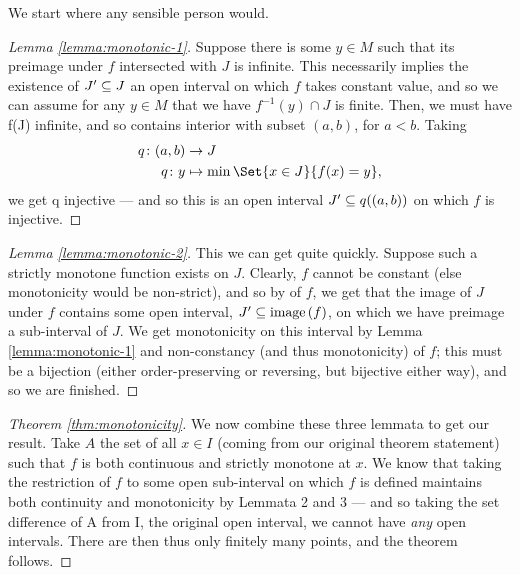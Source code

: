 We start where any sensible person would.

\begin{proof}[Lemma \ref{lemma:monotonic-1}]
  Suppose there is some $y \in M$ such that its preimage under $f$ intersected with $J$ is infinite. This necessarily implies the existence of $ J^{\prime} \subseteq J$ an open interval on which $f$ takes constant value, and so we can assume for any $y \in M$ that we have $f^{-1}(y) \cap J$ is finite. Then, we must have f(J) infinite, and so contains interior with subset $ (a, b) $, for $a < b$. Taking
  \begin{align*}
    q \colon (a, b) &\to J \\
    q \colon y &\mapsto \min{\Set{x \in J}{f(x) = y}},
  \end{align*}
  we get q injective — and so this is an open interval $ J^{\prime} \subseteq q((a, b))$ on which $f$ is injective.
\end{proof}


\begin{proof}[Lemma \ref{lemma:monotonic-2}]
  This we can get quite quickly. Suppose such a strictly monotone function exists on $J$. Clearly, $f$ cannot be constant (else monotonicity would be non-strict), and so by \omy of $f$, we get that the image of $J$ under $f$ contains some open interval, $ J^{\prime} \subseteq \operatorname{image}\left(f\right)$, on which we have preimage a sub-interval of $J$. We get monotonicity on this interval by Lemma \ref{lemma:monotonic-1} and non-constancy (and thus monotonicity) of $f$; this must be a bijection (either order-preserving or reversing, but bijective either way), and so we are finished.
\end{proof}



\begin{proof}[Theorem \ref{thm:monotonicity}]
  We now combine these three lemmata to get our result. Take $A$ the set of all $x \in I$ (coming from our original theorem statement) such that $f$ is both continuous and strictly monotone at $x$. We know that taking the restriction of $f$ to some open sub-interval on which $f$ is defined maintains both continuity and monotonicity by Lemmata 2 and 3 — and so taking the set difference of A from I, the original open interval, we cannot have \emph{any} open intervals. There are then thus only finitely many points, and the theorem follows.
\end{proof}

